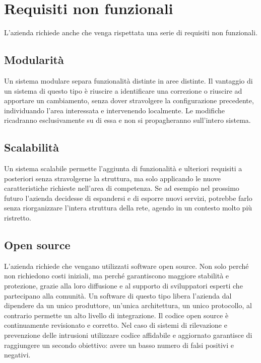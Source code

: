 \section{Requisiti non funzionali}

L'azienda richiede anche che venga rispettata una serie di requisiti non funzionali.

\subsection{Modularità}

Un sistema modulare separa funzionalità distinte in aree distinte. Il vantaggio di un sistema di questo tipo è riuscire a identificare una correzione o riuscire ad apportare un cambiamento, senza dover stravolgere la configurazione precedente, individuando l'area interessata e intervenendo localmente. Le modifiche ricadranno esclusivamente su di essa e non si propagheranno sull'intero sistema.

\subsection{Scalabilità}

Un sistema scalabile permette l’aggiunta di funzionalità e ulteriori requisiti a posteriori senza stravolgerne la struttura, ma solo applicando le nuove caratteristiche richieste nell'area di competenza. Se ad esempio nel prossimo futuro l'azienda decidesse di espandersi e di esporre nuovi servizi, potrebbe farlo senza riorganizzare l'intera struttura della rete, agendo in un contesto molto più ristretto.

\subsection{Open source}

L'azienda richiede che vengano utilizzati software open source. Non solo perché non richiedono costi iniziali, ma perché garantiscono maggiore stabilità e protezione, grazie alla loro diffusione e al supporto di sviluppatori esperti che partecipano alla comunità. Un software di questo tipo libera l’azienda dal dipendere da un unico produttore, un’unica architettura, un unico protocollo, al contrario permette un alto livello di integrazione. Il codice open source è continuamente revisionato e corretto. Nel caso di sistemi di rilevazione e prevenzione delle intrusioni utilizzare codice affidabile e aggiornato garantisce di raggiungere un secondo obiettivo: avere un basso numero di falsi positivi e negativi.